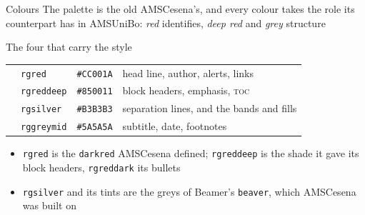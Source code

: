 \documentclass[presentation,cesena,apice]{beamer}\mode<presentation>{\usetheme{AMSRedGrey}}
\newcommand{\swatch}[1]{\fcolorbox{rggreyline}{#1}{\rule{0pt}{1.3ex}\rule{2.2ex}{0pt}}}
\begin{document}
\begin{frame}[c,fragile]{Colours}
%
The palette is the old \alert{AMSCesena}'s, and every colour takes the role its
counterpart has in \alert{AMSUniBo}: \textcolor{rgred}{\textit{red}} identifies,
\textcolor{rgreddeep}{\textit{deep red}} and \textcolor{rggreymid}{\textit{grey}} structure
%
\begin{exampleblock}{The four that carry the style}
\begin{tabular}{@{}llll@{}}
\swatch{rgred}     & \texttt{rgred}     & \texttt{\#CC001A} & head line, author, alerts, links \\
\swatch{rgreddeep} & \texttt{rgreddeep} & \texttt{\#850011} & block headers, emphasis, \textsc{toc} \\
\swatch{rgsilver}   & \texttt{rgsilver}   & \texttt{\#B3B3B3} & separation lines, and the bands and fills \\
\swatch{rggreymid}  & \texttt{rggreymid}  & \texttt{\#5A5A5A} & subtitle, date, footnotes \\
\end{tabular}
\end{exampleblock}
%
\begin{itemize}
	\item \texttt{rgred} is the \texttt{darkred} \alert{AMSCesena} defined;
	      \texttt{rgreddeep} is the shade it gave its block headers, \texttt{rgreddark} its bullets
	\item \texttt{rgsilver} and its tints are the greys of Beamer's \texttt{beaver}, which
	      \alert{AMSCesena} was built on
\end{itemize}
%
\end{frame}
\end{document}
